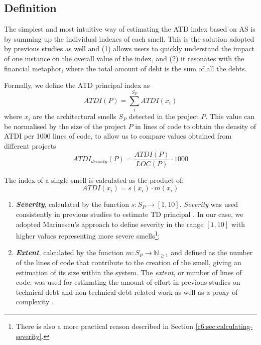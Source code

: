 \subsection{Definition}\label{c6:sec:approach-definition}
The simplest and most intuitive way of estimating the ATD index based on AS is by summing up the individual indexes of each smell\cite{Ampatzoglou2018}.
This is the solution adopted by previous studies as well \cite{Letouzey2010,Curtis2012,Marinescu2012,Roveda2018} and (1) allows users to quickly understand the impact of one instance on the overall value of the index, and (2) it resonates with the financial metaphor, where the total amount of debt is the sum of all the debts.

Formally, we define the ATD principal index as
\begin{equation}\label{c6:eq:atdi}
    ATDI(P) =  \sum_i^{S_P} ATDI(x_i)
\end{equation}
where $x_i$ are the architectural smells $S_P$ detected in the project $P$.
This value can be normalised by the size of the project $P$ in lines of code to obtain the density of ATDI per 1000 lines of code, to allow us to compare values obtained from different projects
\begin{equation}\label{c6:eq:atdi-normalised}
    ATDI_{density}(P) = \frac{ATDI(P)}{LOC(P)} \cdot 1000
\end{equation}

The index of a single smell is calculated as the product of: 
\begin{equation}\label{c6:eq:atdi-smell}
    ATDI(x_i) = s(x_i) \cdot m(x_i)
\end{equation}
\begin{enumerate}[label=\alph*)]
    \item \textbf{\emph{Severity}}, calculated by the function $s : S_P \rightarrow  [1, 10]$. \emph{Severity} was used consistently in previous studies to estimate TD principal \cite{Roveda2018,Marinescu2012,Curtis2012}. In our case, we adopted Marinescu's \cite{Marinescu2012} approach to define severity in the range $[1, 10]$ with higher values representing more severe smells\footnote{There is also a more practical reason described in Section \ref{c6:sec:calculating-severity}.};
    \item \textbf{\emph{Extent}}, calculated by the function $m : S_P \rightarrow  \mathbb{N}_{\ge 1}$ and defined as the number of the lines of code that contribute to the creation of the smell, giving an estimation of its size within the system. The \emph{extent}, or number of lines of code, was used for estimating the amount of effort in previous studies on technical debt \cite{Chatzigeorgiou2015,Kamei2016,Nugroho2011} and non-technical debt related work as well as a proxy of complexity \cite{Morasca2001, Kitchenham2004}. 
\end{enumerate}

